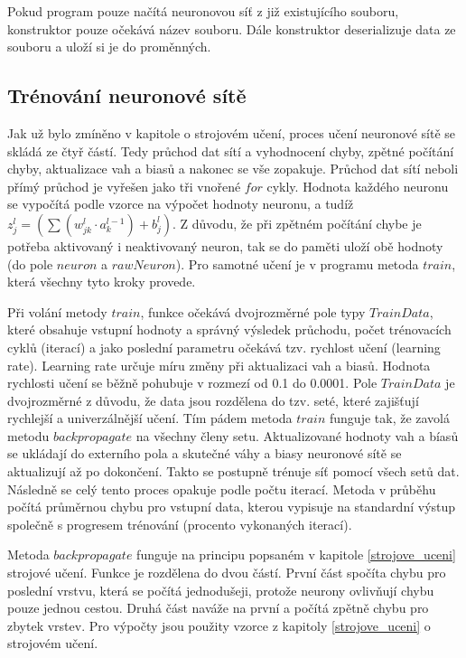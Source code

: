 Pokud program pouze načítá neuronovou síť z již existujícího souboru, konstruktor pouze očekává název souboru.
Dále konstruktor deserializuje data ze souboru a uloží si je do proměnných.

\subsection{Trénování neuronové sítě}
Jak už bylo zmíněno v kapitole o strojovém učení, proces učení neuronové sítě se skládá ze čtyř částí. Tedy průchod dat sítí a vyhodnocení chyby,
zpětné počítání chyby, aktualizace vah a biasů a nakonec se vše zopakuje. Průchod dat sítí neboli přímý průchod je vyřešen jako tři vnořené \(for\) cykly.
Hodnota každého neuronu se vypočítá podle vzorce na výpočet hodnoty neuronu, a tudíž \(z_{j}^{l} = \left( \sum (w^{l}_{jk} \cdot a^{l-1}_k) + b^l_j \right)\).
Z důvodu, že při zpětném počítání chybe je potřeba aktivovaný i neaktivovaný neuron, tak se do paměti uloží obě hodnoty (do pole \(neuron\) a \(rawNeuron\)).
Pro samotné učení je v programu metoda \(train\), která všechny tyto kroky provede.

Při volání metody \(train\), funkce očekává dvojrozměrné pole typy \(TrainData\), které obsahuje vstupní hodnoty a správný výsledek průchodu,
počet trénovacích cyklů (iterací) a jako poslední parametru očekává tzv. rychlost učení (learning rate).
Learning rate určuje míru změny při aktualizaci vah a biasů. Hodnota rychlosti učení se běžně pohubuje v rozmezí od 0.1 do 0.0001.
Pole \(TrainData\) je dvojrozměrné z důvodu, že data jsou rozdělena do tzv. seté, které zajišťují rychlejší a univerzálnější učení.
Tím pádem metoda \(train\) funguje tak, že zavolá metodu \(backpropagate\) na všechny členy setu.
Aktualizované hodnoty vah a bíasů se ukládají do externího pola a skutečné váhy a biasy neuronové sítě se aktualizují až po dokončení.
Takto se postupně trénuje síť pomocí všech setů dat. Následně se celý tento proces opakuje podle počtu iterací.
Metoda v průběhu počítá průměrnou chybu pro vstupní data, kterou vypisuje na standardní výstup společně s progresem trénování (procento vykonaných iterací).

Metoda \(backpropagate\) funguje na principu popsaném v kapitole \ref{strojove_uceni} strojové učení. Funkce je rozdělena do dvou částí.
První část spočíta chybu pro poslední vrstvu, která se počítá jednodušeji, protože neurony ovlivňují chybu pouze jednou cestou.
Druhá část naváže na první a počítá zpětně chybu pro zbytek vrstev. Pro výpočty jsou použity vzorce z kapitoly \ref{strojove_uceni} o strojovém učení.

